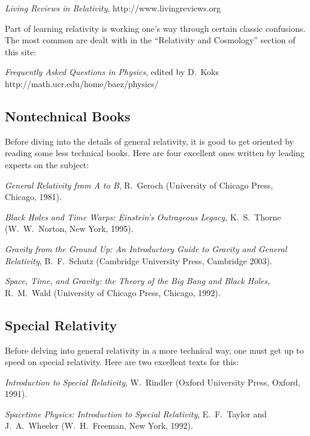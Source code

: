 \medskip
\noindent
{\sl Living Reviews in Relativity}, http://www.livingreviews.org



\medskip
\noindent
Part of learning relativity is working one's way through certain classic
confusions.  The most common are dealt with in the ``Relativity
and Cosmology'' section of this site:

\medskip 
\noindent
{\it Frequently Asked Questions in Physics}, 
edited by D.\ Koks
\hfill \break http://math.ucr.edu/home/baez/physics/



\subsection*{Nontechnical Books}

Before diving into the details of general relativity, it is good
to get oriented by reading some less technical books.  Here are
four excellent ones written by leading experts on the subject:

\medskip
\noindent
{\it General Relativity from A to B}, R.\ Geroch
(University of Chicago Press, Chicago, 1981).

\medskip
\noindent
{\it Black Holes and Time Warps: Einstein's Outrageous Legacy}, K.\ S.\ 
Thorne (W.\ W.\ Norton, New York, 1995).

\medskip
\noindent
{\it Gravity from the Ground Up:
An Introductory Guide to Gravity and General Relativity},
B.\ F.\ Schutz (Cambridge University Press, Cambridge 2003).

\medskip
\noindent
{\it Space, Time, and Gravity: the Theory of the Big Bang and Black Holes,} 
R.\ M.\ Wald (University of Chicago Press, Chicago, 1992).

\subsection*{Special Relativity}

Before delving into general relativity in a more technical way, one
must get up to speed on special relativity.  Here are two excellent
texts for this:

\medskip
\noindent
{\it Introduction to Special Relativity}, W.\ Rindler
(Oxford University Press, Oxford, 1991).

\medskip
\noindent
{\it Spacetime Physics: Introduction to Special Relativity},
E.\ F.\ Taylor and J.\ A.\ Wheeler
(W.\ H.\ Freeman, New York, 1992).

